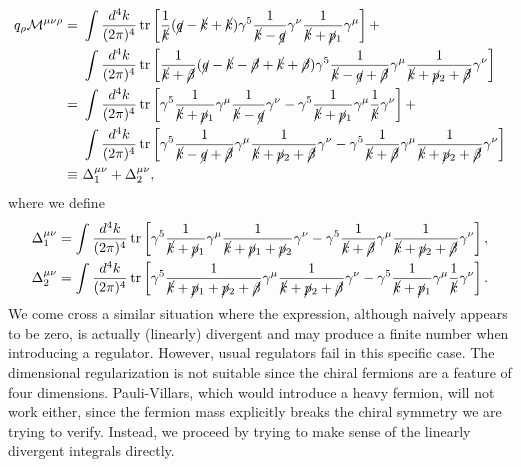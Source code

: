 \begin{equation}
\begin{aligned}
	q_\rho \mathcal{M}^{\mu\nu\rho} 
	=&\ \int \frac{d^{4} k}{(2 \pi)^{4}} \operatorname{tr}\left[\frac{1}{\cancel k} (\cancel{q}-\cancel{k}+\cancel{k}) \gamma^{5} \frac{1}{\cancel k-\cancel q} \gamma^{\nu} \frac{1}{\cancel k+\cancel p_{1}} \gamma^\mu \right] + \\
	&\ \int \frac{d^{4} k}{(2 \pi)^{4}} \operatorname{tr}\left[\frac{1}{\cancel k +\cancel \beta} (\cancel{q}-\cancel{k}-\cancel \beta +\cancel{k} +\cancel\beta) \gamma^{5} \frac{1}{\cancel k-\cancel q+\cancel\beta} \gamma^{\mu} \frac{1}{\cancel k+\cancel p_{2}+\cancel \beta} \gamma^\nu \right] \\
	=&\ \int \frac{d^{4} k}{(2 \pi)^{4}} \operatorname{tr}\left[\gamma^{5} \frac{1}{\cancel k+\cancel p_{1}} \gamma^\mu \frac{1}{\cancel k-\cancel q} \gamma^{\nu}  -  \gamma^{5}   \frac{1}{\cancel k+\cancel p_{1}} \gamma^\mu \frac{1}{\cancel k} \gamma^{\nu} \right]+ \\
	&\ \int \frac{d^{4} k}{(2 \pi)^{4}} \operatorname{tr}\left[\gamma^{5} \frac{1}{\cancel k-\cancel q+\cancel\beta} \gamma^{\mu} \frac{1}{\cancel k+\cancel p_{2}+\cancel \beta} \gamma^\nu -\gamma^5\frac{1}{\cancel k+\cancel\beta}\gamma^\mu\frac{1}{\cancel k+\cancel p_2+\cancel\beta}\gamma^\nu\right] \\
	\equiv &\ \Delta^{\mu\nu}_1 + \Delta^{\mu\nu}_2,
\end{aligned}
\end{equation}
where we define
\begin{equation}\label{eq:AN-Tri-div-int}
\begin{aligned}
	\Delta^{\mu\nu}_1 &= \int \frac{d^{4} k}{(2 \pi)^{4}} \operatorname{tr}\left[
		\gamma^{5} \frac{1}{\cancel k+\cancel p_{1}} \gamma^\mu \frac{1}{\cancel k+\cancel p_1+\cancel p_2} \gamma^{\nu} -
		\gamma^5\frac{1}{\cancel k+\cancel\beta}\gamma^\mu\frac{1}{\cancel k+\cancel p_2+\cancel\beta}\gamma^\nu 
	\right], \\
	\Delta^{\mu\nu}_2 &= \int \frac{d^{4} k}{(2 \pi)^{4}} \operatorname{tr}\left[
		\gamma^{5} \frac{1}{\cancel k+\cancel p_1 +\cancel p_2+\cancel\beta} \gamma^{\mu} \frac{1}{\cancel k+\cancel p_{2}+\cancel \beta} \gamma^\nu -
		\gamma^{5}   \frac{1}{\cancel k+\cancel p_{1}} \gamma^\mu \frac{1}{\cancel k} \gamma^{\nu}
	\right].
\end{aligned}
\end{equation}
We come cross a similar situation where the expression, although naively appears to be zero, is actually (linearly) divergent and may produce a finite number when introducing a regulator.
However, usual regulators fail in this specific case.
The dimensional regularization is not suitable since the chiral fermions are a feature of four dimensions.
Pauli-Villars, which would introduce a heavy fermion, will not work either, since the fermion mass explicitly breaks the chiral symmetry we are trying to verify. 
Instead, we proceed by trying to make sense of the linearly divergent integrals directly.

